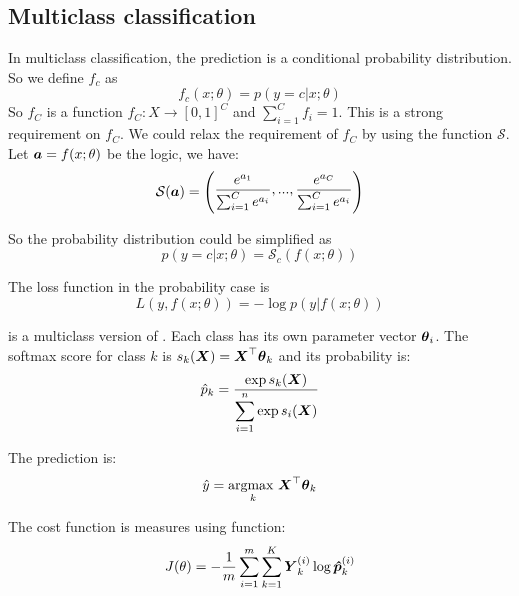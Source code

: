 \subsection{Multiclass classification}

In multiclass classification, the prediction is a conditional probability distribution. So we define $f_c$ as
    \begin{equation}
        f_c(x;\theta) = p(y=c|x;\theta)
    \end{equation}
    So $f_C$ is a function $f_C: X \rightarrow [0,1]^C$ and $\displaystyle \sum_{i=1}^C f_i = 1$. This is a strong requirement on $f_C$. We could relax the requirement of $f_C$ by using the  function $\mathcal{S}$. Let $\boldsymbol{a} = f(x;\theta)$ be the logic, we have:
    \begin{equation}
        \mathcal{S}(\boldsymbol{a}) = \begin{pmatrix}\displaystyle
            \frac{e^{a_1}}{\sum_{i=1}^C e^{a_i}}, ..., \frac{e^{a_C}}{\sum_{i=1}^C e^{a_i}}
        \end{pmatrix}
    \end{equation}
    
    So the probability distribution could be simplified as
    \begin{equation}
        p(y=c|x;\theta) = \mathcal{S}_c \left(f(x;\theta)\right)
    \end{equation}
    
    The loss function in the probability case is 
    \begin{equation}
        L(y, f(x;\theta)) = - \log p(y|f(x;\theta))
    \end{equation}


 is a multiclass version of . Each class has its own parameter vector $\boldsymbol{\theta}_i$. The softmax score for class $k$ is $s_k (\boldsymbol{X} ) = \boldsymbol{X}^\top \boldsymbol{\theta}_k$ and its probability is:
\begin{equation}
    \hat{p}_k = \frac{\exp{{s_k (\boldsymbol{X})}}}{\displaystyle \sum_{i=1}^n \exp{s_i (\boldsymbol{X}) } }
\end{equation}

The prediction is:
\begin{equation}
	\hat{y} = \underset{k}{\text{argmax }} \boldsymbol{X}^\top \boldsymbol{\theta}_k
\end{equation}

The cost function is measures using  function:
\begin{equation}
	J(\theta)= -\frac{1}{m} \sum_{i=1}^m \sum_{k=1}^K \boldsymbol{Y}^{(i)}_k \log \boldsymbol{\hat{p}}^{(i)}_k
\end{equation}


